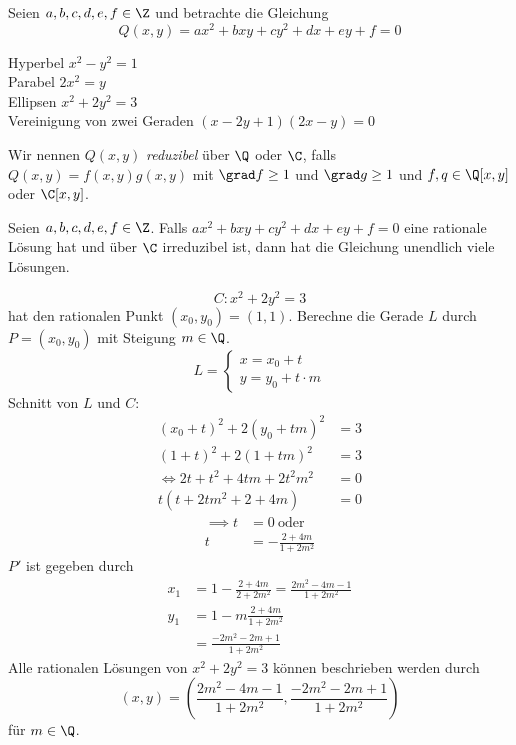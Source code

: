 Seien $a,b,c,d,e,f \in \Z$ und betrachte die Gleichung 
\[ Q(x,y) = ax^2+bxy+cy^2+dx+ey+f = 0 \]

\begin{exmp*}
	Hyperbel $x^2-y^2 = 1$\\
	Parabel $2x^2=y$\\
	Ellipsen $x^2+2y^2=3$\\
	Vereinigung von zwei Geraden $(x-2y+1)(2x-y)=0$
\end{exmp*}

Wir nennen $Q(x,y)$ \emph{reduzibel} über $\Q$ oder $\C$, falls $Q(x,y) = f(x,y)g(x,y)$ mit $\grad f \geq1$ und $\grad g \geq 1$ und $f,q \in \Q[x,y]$ oder $\C[x,y]$.

\begin{thm}\autolabel
	Seien $a,b,c,d,e,f \in \Z$. Falls $ ax^2+bxy+cy^2+dx+ey+f = 0$ eine rationale Lösung hat und über $\C$ irreduzibel ist, dann hat die Gleichung unendlich viele Lösungen.
\end{thm}

\begin{exmp*}
	\[ C: x^2+2y^2=3 \]
	hat den rationalen Punkt $(x_0,y_0) = (1,1)$. Berechne die Gerade $L$ durch $P = (x_0,y_0)$ mit Steigung $m \in \Q$.
	\[ L = \begin{cases}
		x = x_0 + t\\
		y = y_0 + t \cdot m
	\end{cases} \]
	Schnitt von $L$ und $C$:
	\begin{align*}
		(x_0+t)^2 + 2(y_0+tm)^2 &= 3\\
		(1+t)^2 + 2(1+tm)^2 &= 3\\
		\iff 2t + t^2 + 4tm + 2t^2m^2 &= 0\\
		t(t+2tm^2 + 2 + 4m) &= 0
	\end{align*}
	\begin{align*}
		\implies t &= 0 \ \text{oder}\\
		t &= -\frac{2+4m}{1+2m^2}
	\end{align*}
	$P'$ ist gegeben durch
	\begin{align*}
		x_1 &= 1- \frac{2+4m}{2+2m^2} = \frac{2m^2 - 4m - 1}{1+2m^2}\\
		y_1 &= 1-m \frac{2+4m}{1+2m^2}\\
		&= \frac{-2m^2 - 2m+1}{1+2m^2}
	\end{align*}
	Alle rationalen Lösungen von $x^2+2y^2 = 3$ können beschrieben werden durch
	\[ (x,y) = \left( \frac{2m^2-4m-1}{1+2m^2} , \frac{-2m^2 - 2m + 1}{1 + 2m^2} \right) \]
	für $m \in \Q$.
\end{exmp*}